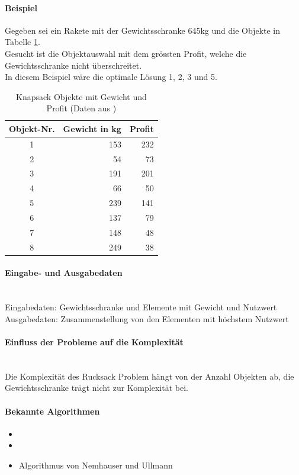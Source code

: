 	\paragraph{Beispiel} Gegeben sei ein Rakete mit der Gewichtsschranke 645kg und die Objekte in Tabelle \ref{table:knapsack_objects}.\\
Gesucht ist die Objektauswahl mit dem grössten Profit, welche die Gewichtsschranke nicht überschreitet.\\
In diesem Beispiel wäre die optimale Lösung 1, 2, 3 und 5. \cite{knapsack_desc_web}

\begin{table}[ht]
\centering
  \begin{tabular}{ c | r | r }
	\hline
	\rowcolor{gray}
	\textbf{Objekt-Nr.}	&	\textbf{Gewicht in kg}	&	\textbf{Profit}\\ \hline
	1			&	153			&	232\\ \hline
	2			&	54			&	73\\ \hline
	3			&	191			&	201\\ \hline
	4			&	66			&	50\\ \hline
	5			&	239			&	141\\ \hline
	6			&	137			&	79\\ \hline
	7			&	148			&	48\\ \hline
	8			&	249			&	38
  \end{tabular}
   \caption[Knapsack Objekte mit Gewicht und Profit]{Knapsack Objekte mit Gewicht und Profit (Daten aus \cite{knapsack_desc_web})}\label{table:knapsack_objects}
\end{table}

	\paragraph{Eingabe- und Ausgabedaten}\mbox{}\\
	Eingabedaten: Gewichtsschranke und Elemente mit Gewicht und Nutzwert\\
	Ausgabedaten: Zusammenstellung von den Elementen mit höchstem Nutzwert

	\paragraph{Einfluss der Probleme auf die Komplexität}\mbox{}\\
	Die Komplexität des Rucksack Problem hängt von der Anzahl Objekten ab, die Gewichtsschranke trägt nicht zur Komplexität bei.

	\paragraph{Bekannte Algorithmen}
	\begin{itemize}
		\item {}
		\item {}
		\item Algorithmus von Nemhauser und Ullmann \cite{knapsack_desc_web}
	\end{itemize}	

